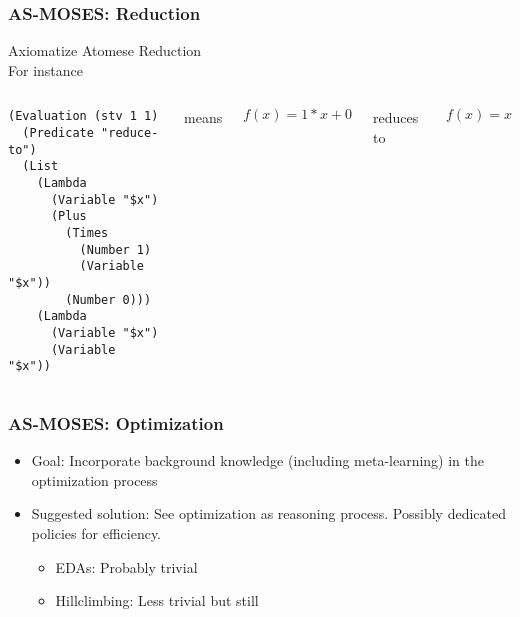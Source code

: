 \documentclass{beamer}
\begin{document}
\begin{frame}[fragile]
  \frametitle{AS-MOSES: Reduction}

\alert{Axiomatize Atomese Reduction}\\[0.5cm]

For instance
\begin{columns}

\column{2in}
  
{\tiny
\begin{verbatim}
(Evaluation (stv 1 1)
  (Predicate "reduce-to")
  (List
    (Lambda
      (Variable "$x")
      (Plus
        (Times
          (Number 1)
          (Variable "$x"))
        (Number 0)))
    (Lambda
      (Variable "$x")
      (Variable "$x"))
\end{verbatim}}

\column{0.5in}
  
{\tiny means}

\column{2in}

$$f(x) = 1*x + 0$$

\begin{center}{\tiny reduces to}\end{center}

$$f(x) = x$$

\end{columns}

\end{frame}

\begin{frame}
  \frametitle{AS-MOSES: Optimization}

  \begin{itemize}
  \item<+-> Goal: Incorporate \alert{background knowledge} (including
    meta-learning) in the optimization process
  \item<+-> Suggested solution: See optimization as \alert{reasoning
      process}. Possibly dedicated policies for efficiency.
    \begin{itemize}
    \item EDAs: Probably trivial
    \item Hillclimbing: Less trivial but still
    \end{itemize}
  \end{itemize}
\end{frame}
\end{document}
